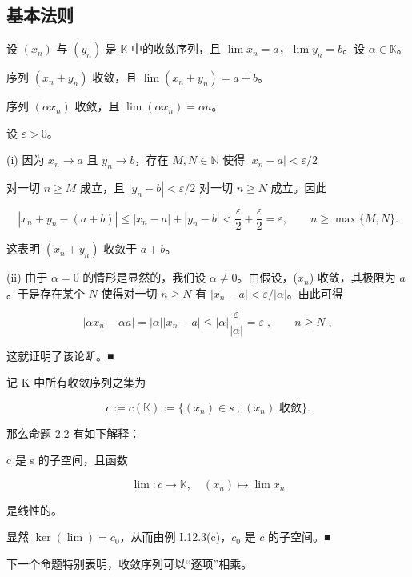 \subsection*{基本法则}

\begin{proposition}

设 $ (x_n) $ 与 $ (y_n) $ 是 $ \mathbb{K} $ 中的收敛序列，且 $ \lim x_n = a $，$ \lim y_n = b $。设 $ \alpha \in \mathbb{K} $。

\begin{subitems}
\item

序列 $ (x_{n} + y_{n}) $ 收敛，且 $ \lim(x_{n} + y_{n}) = a + b $。

\item

序列 $ (\alpha x_n) $ 收敛，且 $ \lim(\alpha x_n) = \alpha a $。

\proofhead
设 $ \varepsilon > 0 $。
\end{subitems}

(i) 因为 $ x_n \to a $ 且 $ y_n \to b $，存在 $ M, N \in \mathbb{N} $ 使得 $ |x_n - a| < \varepsilon/2 $

对一切 $ n \geq M $ 成立，且 $ |y_n - b| < \varepsilon/2 $ 对一切 $ n \geq N $ 成立。因此

\[
\left|x_{n}+y_{n}-(a+b)\right|\leq\left|x_{n}-a\right|+\left|y_{n}-b\right|<\frac{\varepsilon}{2}+\frac{\varepsilon}{2}=\varepsilon,\qquad n\geq\max\{M,N\}.
\]

这表明 $ (x_{n} + y_{n}) $ 收敛于 $ a + b $。

(ii) 由于 $ \alpha = 0 $ 的情形是显然的，我们设 $ \alpha \neq 0 $。由假设，($ x_n $) 收敛，其极限为 $ a $。于是存在某个 $ N $ 使得对一切 $ n \geq N $ 有 $ |x_n - a| < \varepsilon / |\alpha| $。由此可得

\[
\left|\alpha x_{n}-\alpha a\right|=\left|\alpha\right|\left|x_{n}-a\right|\leq\left|\alpha\right|\frac{\varepsilon}{\left|\alpha\right|}=\varepsilon\;,\qquad n\geq N\;,
\]

这就证明了该论断。■

\end{proposition}

\begin{remark}

记 K 中所有收敛序列之集为

\[
c:=c(\mathbb{K}):=\bigl\{(x_{n})\in s~;~\left(x_{n}\right)\text{ 收敛}\bigr\}.
\]

那么命题 2.2 有如下解释：

c 是 s 的子空间，且函数

\[
\lim:c\to\mathbb{K},\quad(x_{n})\mapsto\lim x_{n}
\]

是线性的。

显然 $ \ker(\lim) = c_0 $，从而由例 I.12.3(c)，$ c_0 $ 是 $ c $ 的子空间。■

下一个命题特别表明，收敛序列可以“逐项”相乘。

\end{remark}

